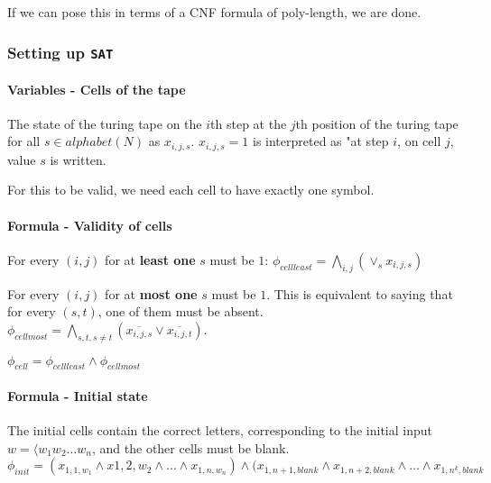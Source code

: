 If we can pose this in terms of a CNF formula of poly-length, we are done.

\subsubsection{Setting up \texttt{SAT}}

\paragraph{\textbf{Variables - Cells of the tape}}
The state of the turing tape on the $i$th step at the $j$th position of the
turing tape for all $s \in alphabet(N)$ as $x_{i, j, s}$. $x_{i, j, s} = 1$
is interpreted as "at step $i$, on cell $j$, value $s$ is written.

For this to be valid, we need each cell to have exactly one symbol.


\paragraph{\textbf{Formula - Validity of cells}}
For every $(i, j)$ for at \textbf{least one} $s$ must be $1$:
$\phi_{cell least} = \bigwedge\limits_{i, j} (\lor_s x_{i, j, s})$


For every $(i, j)$ for at \textbf{most one} $s$ must be $1$. This is equivalent
to saying that for every $(s, t)$, one of them must be absent.
$\phi_{cell most} = \bigwedge\limits_{s, t, s \neq t} (\overline{x_{i, j, s}} \lor \overline{x_{i, j, t}})$.

$\phi_{cell} = \phi_{cell least} \land \phi_{cell most}$


\paragraph{\textbf{Formula - Initial state}}
The initial cells contain the correct letters, corresponding to the initial
input $w = \langle w_1 w_2 \dots w_n$, and the other cells must be blank.
$\phi_{init} = (x_{1, 1, w_1} \land x{1, 2, w_2} \land \dots \land x_{1, n, w_n}) \land
(x_{1, n + 1, blank} \land x_{1, n + 2, blank} \land \dots \land x_{1, n^k, blank}$



